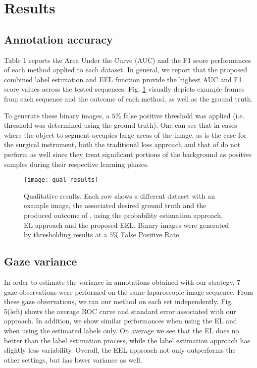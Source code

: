 \section{Results}
\subsection{Annotation accuracy}
Table 1 reports the Area Under the Curve (AUC) and the F1 score performances of each method applied to each dataset.
In general, we report that the proposed combined label estimation and EEL function provide the highest AUC and F1 score values across the tested sequences.
Fig. \ref{fig:eel_qual_res} visually depicts example frames from each sequence and the outcome of each method, as well as the ground truth.

To generate these binary images, a $5\%$ false positive threshold was applied (i.e. threshold was determined using the ground truth).
One can see that in cases where the object to segment occupies large areas of the image,
as is the case for the surgical instrument, both the traditional loss approach and that of \cite{vilarino07} do not perform as well since they treat significant portions of the background as positive samples during their respective learning phases.

\begin{figure}[ht]
\texttt{[image: qual\_results]}
\caption{Qualitative results. Each row shows a different dataset with an example image,
the associated desired ground truth and the produced outcome of \cite{vilarino07}, using the probability
estimation approach, EL approach and the proposed EEL.
Binary images were generated by thresholding results at a $5\%$ False Positive Rate.}
\label{fig:eel_qual_res}
\end{figure}



\subsection{Gaze variance}
In order to estimate the variance in annotations obtained with our strategy, $7$ gaze observations were performed on the same laparoscopic image sequence.
From these gaze observations, we ran our method on each set independently.
Fig. 5(left) shows the average ROC curve and standard error associated with our approach.
In addition, we show similar performances when using the EL and when using the estimated labels only.
On average we see that the EL does no better than the label estimation process, while the label estimation approach has slightly less variability.
Overall, the EEL approach not only outperforms the other settings, but has lower variance as well.

